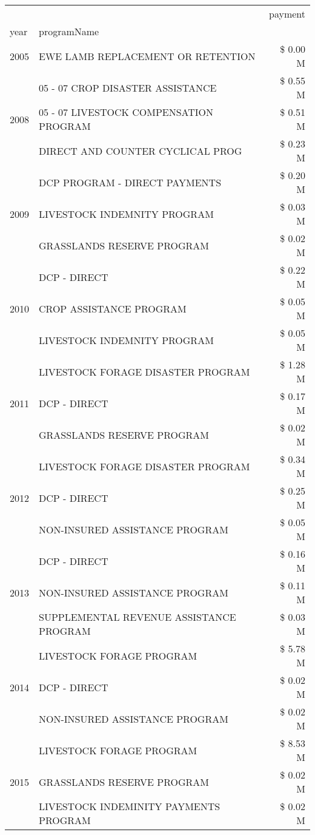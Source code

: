 \begin{tabular}{llr}
\toprule
 &  & payment \\
year & programName &  \\
\midrule
2005 & EWE LAMB REPLACEMENT OR RETENTION & \$ 0.00 M \\
\cline{1-3}
\multirow[t]{3}{*}{2008} & 05 - 07 CROP DISASTER ASSISTANCE & \$ 0.55 M \\
 & 05 - 07 LIVESTOCK COMPENSATION PROGRAM & \$ 0.51 M \\
 & DIRECT AND COUNTER CYCLICAL PROG & \$ 0.23 M \\
\cline{1-3}
\multirow[t]{3}{*}{2009} & DCP PROGRAM - DIRECT PAYMENTS & \$ 0.20 M \\
 & LIVESTOCK INDEMNITY PROGRAM & \$ 0.03 M \\
 & GRASSLANDS RESERVE PROGRAM & \$ 0.02 M \\
\cline{1-3}
\multirow[t]{3}{*}{2010} & DCP - DIRECT & \$ 0.22 M \\
 & CROP ASSISTANCE PROGRAM & \$ 0.05 M \\
 & LIVESTOCK INDEMNITY PROGRAM & \$ 0.05 M \\
\cline{1-3}
\multirow[t]{3}{*}{2011} & LIVESTOCK FORAGE DISASTER PROGRAM & \$ 1.28 M \\
 & DCP - DIRECT & \$ 0.17 M \\
 & GRASSLANDS RESERVE PROGRAM & \$ 0.02 M \\
\cline{1-3}
\multirow[t]{3}{*}{2012} & LIVESTOCK FORAGE DISASTER PROGRAM & \$ 0.34 M \\
 & DCP - DIRECT & \$ 0.25 M \\
 & NON-INSURED ASSISTANCE PROGRAM & \$ 0.05 M \\
\cline{1-3}
\multirow[t]{3}{*}{2013} & DCP - DIRECT & \$ 0.16 M \\
 & NON-INSURED ASSISTANCE PROGRAM & \$ 0.11 M \\
 & SUPPLEMENTAL REVENUE ASSISTANCE PROGRAM & \$ 0.03 M \\
\cline{1-3}
\multirow[t]{3}{*}{2014} & LIVESTOCK FORAGE PROGRAM & \$ 5.78 M \\
 & DCP - DIRECT & \$ 0.02 M \\
 & NON-INSURED ASSISTANCE PROGRAM & \$ 0.02 M \\
\cline{1-3}
\multirow[t]{3}{*}{2015} & LIVESTOCK FORAGE PROGRAM & \$ 8.53 M \\
 & GRASSLANDS RESERVE PROGRAM & \$ 0.02 M \\
 & LIVESTOCK INDEMINITY PAYMENTS PROGRAM & \$ 0.02 M \\

\end{tabular}
